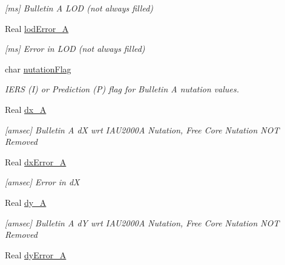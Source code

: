 \begin{DoxyCompactItemize}
\begin{DoxyCompactList}\small\item\em \mbox{[}ms\mbox{]} Bulletin A L\+OD (not always filled) \end{DoxyCompactList}\item 
Real \hyperlink{structostk_1_1physics_1_1coord_1_1frame_1_1provider_1_1iers_1_1_finals2000_a_1_1_data_a7d04e269a3890bca4d44fbb2b06c58c0}{lod\+Error\+\_\+A}
\begin{DoxyCompactList}\small\item\em \mbox{[}ms\mbox{]} Error in L\+OD (not always filled) \end{DoxyCompactList}\item 
char \hyperlink{structostk_1_1physics_1_1coord_1_1frame_1_1provider_1_1iers_1_1_finals2000_a_1_1_data_a65177eeddeab5d6bc4b24e2621323300}{nutation\+Flag}
\begin{DoxyCompactList}\small\item\em I\+E\+RS (I) or Prediction (P) flag for Bulletin A nutation values. \end{DoxyCompactList}\item 
Real \hyperlink{structostk_1_1physics_1_1coord_1_1frame_1_1provider_1_1iers_1_1_finals2000_a_1_1_data_a1ce07fb45b2fefc0e92f2bfb4a8e6658}{dx\+\_\+A}
\begin{DoxyCompactList}\small\item\em \mbox{[}amsec\mbox{]} Bulletin A dX wrt I\+A\+U2000A Nutation, Free Core Nutation N\+OT Removed \end{DoxyCompactList}\item 
Real \hyperlink{structostk_1_1physics_1_1coord_1_1frame_1_1provider_1_1iers_1_1_finals2000_a_1_1_data_ae53aa5ba4bd563e666ec128a15db7e0b}{dx\+Error\+\_\+A}
\begin{DoxyCompactList}\small\item\em \mbox{[}amsec\mbox{]} Error in dX \end{DoxyCompactList}\item 
Real \hyperlink{structostk_1_1physics_1_1coord_1_1frame_1_1provider_1_1iers_1_1_finals2000_a_1_1_data_a1b26da6fc3b4ce1726310539e2442f6a}{dy\+\_\+A}
\begin{DoxyCompactList}\small\item\em \mbox{[}amsec\mbox{]} Bulletin A dY wrt I\+A\+U2000A Nutation, Free Core Nutation N\+OT Removed \end{DoxyCompactList}\item 
Real \hyperlink{structostk_1_1physics_1_1coord_1_1frame_1_1provider_1_1iers_1_1_finals2000_a_1_1_data_a8e76ba23bc3ae3dfce1867c50724c955}{dy\+Error\+\_\+A}

\end{DoxyCompactItemize}
